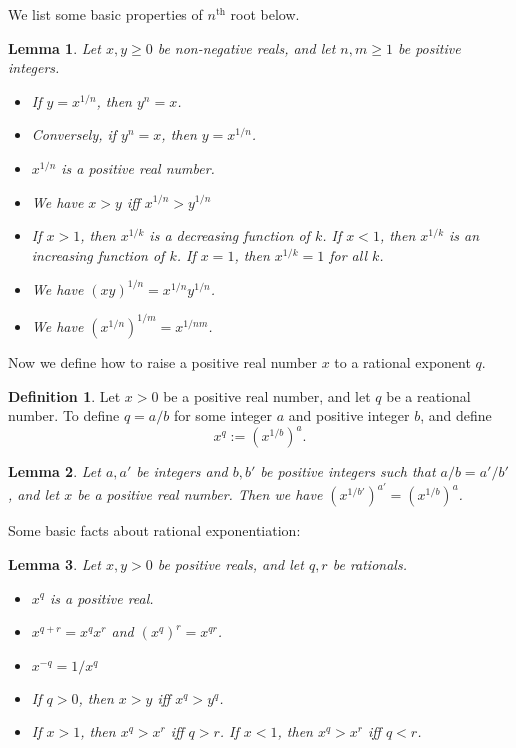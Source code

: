 \documentclass[
]{book}
\providecommand{\tightlist}{%
  \setlength{\itemsep}{0pt}\setlength{\parskip}{0pt}}
\newtheorem{lemma}{Lemma}[chapter]
\theoremstyle{definition}
\newtheorem{definition}{Definition}[chapter]
\theoremstyle{definition}
\theoremstyle{definition}
\theoremstyle{definition}
\theoremstyle{remark}
\begin{document}
We list some basic properties of \(n^{\text{th}}\) root below.

\begin{lemma}

Let \(x,y\geq 0\) be non-negative reals, and let \(n,m\geq 1\) be positive integers.

\begin{itemize}
\tightlist
\item
  If \(y=x^{1/n}\), then \(y^n=x\).
\item
  Conversely, if \(y^n=x\), then \(y=x^{1/n}\).
\item
  \(x^{1/n}\) is a positive real number.
\item
  We have \(x>y\) iff \(x^{1/n}>y^{1/n}\)
\item
  If \(x>1\), then \(x^{1/k}\) is a decreasing function of \(k\). If \(x<1\), then \(x^{1/k}\) is an increasing function of \(k\). If \(x=1\), then \(x^{1/k}=1\) for all \(k\).
\item
  We have \((xy)^{1/n}=x^{1/n}y^{1/n}\).
\item
  We have \((x^{1/n})^{1/m}=x^{1/nm}\).
\end{itemize}

\end{lemma}

Now we define how to raise a positive real number \(x\) to a rational exponent \(q\).

\begin{definition}
Let \(x>0\) be a positive real number, and let \(q\) be a reational number. To define \(q=a/b\) for some integer \(a\) and positive integer \(b\), and define
\[
x^q:=(x^{1/b})^a.
\]
\end{definition}

\begin{lemma}
Let \(a,a'\) be integers and \(b,b'\) be positive integers such that \(a/b=a'/b'\), and let \(x\) be a positive real number. Then we have \((x^{1/b'})^{a'} = (x^{1/b})^a\).
\end{lemma}

Some basic facts about rational exponentiation:

\begin{lemma}

Let \(x,y>0\) be positive reals, and let \(q,r\) be rationals.

\begin{itemize}
\tightlist
\item
  \(x^q\) is a positive real.
\item
  \(x^{q+r} = x^q x^r\) and \((x^q)^r = x^{qr}\).
\item
  \(x^{-q} = 1/x^q\)
\item
  If \(q>0\), then \(x>y\) iff \(x^q>y^q\).
\item
  If \(x>1\), then \(x^q>x^r\) iff \(q>r\). If \(x<1\), then \(x^q>x^r\) iff \(q<r\).
\end{itemize}

\end{lemma}
\end{document}
